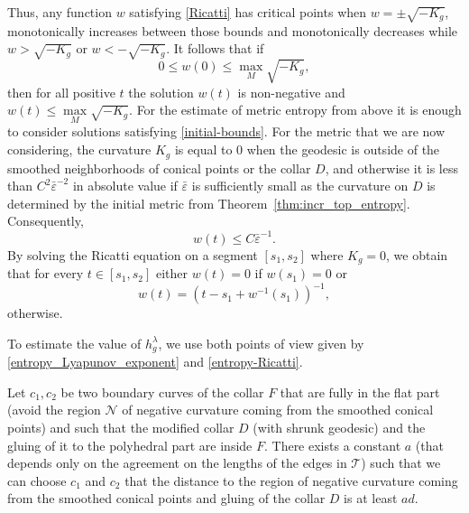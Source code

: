 \documentclass[12pt]{article}
\numberwithin{equation}{section}
\theoremstyle{definition}
\newcommand{\eps}{\varepsilon}
\begin{document}
Thus, any function $w$ satisfying \eqref{Ricatti} has critical points  when  $w=\pm \sqrt{-K_g}$,  monotonically increases between those bounds and monotonically decreases while  $w>\sqrt{-K_g}$ or  $w<-\sqrt{-K_g}$.  It follows that if
  \begin{equation}\label{initial-bounds} 0\leqslant w(0)\leqslant \max\limits_{M}\sqrt{-K_g},\end{equation} 
   then for all positive $t$  the solution $w(t)$ is non-negative and $w(t)\leqslant\max\limits_{M}\sqrt{-K_g}$. For the estimate of metric entropy from above it is enough to consider solutions satisfying \eqref{initial-bounds}. For the metric that we are now considering, the curvature $K_g$ is equal to $0$ when the geodesic is outside of the smoothed neighborhoods of conical points or the collar $D$, and otherwise it is less than $C^2\bar\eps^{-2}$ in absolute value if $\bar\eps$ is sufficiently small as the curvature on $D$ is determined by the initial metric from Theorem~\ref{thm:incr_top_entropy}. Consequently,  
\begin{equation}\label{Ricatti-curved}w(t)\leqslant C\bar\eps^{-1}.\end{equation}
 By solving the Ricatti equation on a segment $[s_1,s_2]$ where $K_g=0$, we obtain that for every $t\in[s_1,s_2]$ either $w(t)=0$ if $w(s_1)=0$ or 
\begin{equation}\label{Ricatti-flat}w(t)=\left(t-s_1+w^{-1}(s_1)\right)^{-1},\end{equation} otherwise.

To estimate the value of $h^{\lambda}_g$, we use both points of view given by \eqref{entropy_Lyapunov_exponent} and \eqref{entropy-Ricatti}.


Let $c_1, c_2$ be two boundary curves of the collar $F$ that are fully in the flat part (avoid the region $\mathcal N$ of negative curvature coming from the smoothed conical points) and such that the modified collar $D$ (with shrunk geodesic) and the gluing of it to the polyhedral part are inside $F$. There exists a constant $a$ (that depends only on the agreement on the lengths of the edges in $\mathcal T$) such that we can choose $c_1$ and $c_2$ that the distance to the region of negative curvature coming from the smoothed conical points and gluing of the collar $D$ is at least $a d$.
\end{document}
